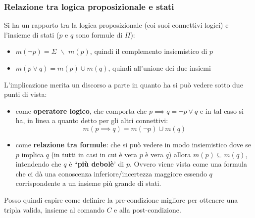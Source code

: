 				      			 \subsubsection{Relazione tra logica proposizionale e stati}
				      				Si ha un rapporto tra la logica proposizionale (coi suoi connettivi logici) e
				      				l'insieme di stati ($p$ e $q$ sono formule di $\Pi$): 
				      				\begin{itemize}
				      					\item $m(\neg p)=\Sigma \,\,\backslash \,\, m(p)$, quindi il complemento
				      					      insiemistico di $p$
				      					\item $m(p\lor q)=m(p)\cup m(q)$, quindi all'unione dei due insiemi  
				      				
				      				\end{itemize}
				      				L'implicazione merita un discorso a parte in quanto ha si può vedere sotto due punti di vista:
				      				\begin{itemize}
				      					\item come \textbf{operatore logico}, che comporta che $p\implies q= \neg p\lor q$
				      					      e in tal caso si ha, in linea a quanto detto per gli altri connettivi:
				      					      \[m(p\implies q)= m(\neg p)\cup m(q)\]
				      					\item come \textbf{relazione tra formule}: che si può vedere in modo insiemistico dove se $p$ implica $q$ (in tutti in
				      					      casi in cui è vera $p$ è vera $q$) allora
				      					      $m(p)\subseteq m(q)$, intendendo che $q$ è ``\textbf{più debolè}' di $p$. Ovvero viene vista come una formula che
				      					      ci dà una conoscenza inferiore/incertezza maggiore essendo $q$ corrispondente a un insieme più
				      					      grande di stati. 
				      				\end{itemize}
				      				Posso quindi capire come definire la pre-condizione migliore per ottenere una
				      				tripla valida, insieme al comando $C$ e alla post-condizione.\\
